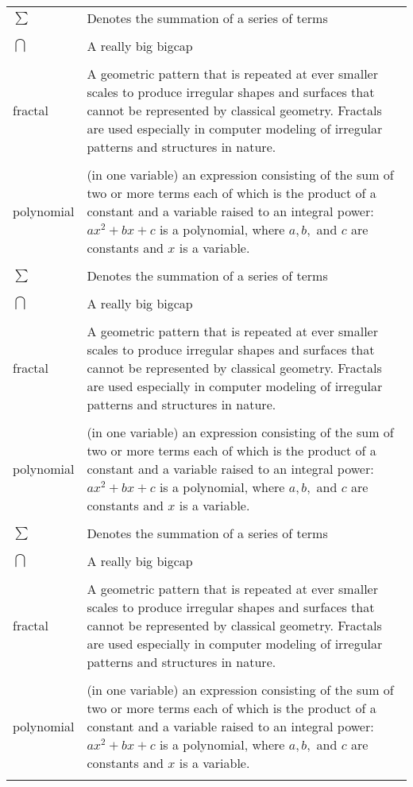 \begin{tabular}{lp{5in}}
$\sum$ & Denotes the summation of a series of terms\\
\\
$\bigcap$ & A really big bigcap\\
\\
fractal & A geometric pattern that is repeated at ever smaller
scales to produce irregular shapes and surfaces that cannot be represented by classical
geometry. Fractals are used especially in computer modeling of irregular patterns and structures in nature.}\\
\\
polynomial & (in one variable) an expression consisting of the sum of two
or more terms each of which is the product of a constant and a
variable raised to an integral power: $ax^2 + bx + c$ is a
polynomial, where $a, b,$ and $c$ are constants and $x$ is a
variable.}\\
\\
$\sum$ & Denotes the summation of a series of terms\\
\\
$\bigcap$ & A really big bigcap\\
\\
fractal & A geometric pattern that is repeated at ever smaller
scales to produce irregular shapes and surfaces that cannot be represented by classical
geometry. Fractals are used especially in computer modeling of irregular patterns and structures in nature.}\\
\\
polynomial & (in one variable) an expression consisting of the sum of two
or more terms each of which is the product of a constant and a
variable raised to an integral power: $ax^2 + bx + c$ is a
polynomial, where $a, b,$ and $c$ are constants and $x$ is a
variable.}\\
\\
$\sum$ & Denotes the summation of a series of terms\\
\\
$\bigcap$ & A really big bigcap\\
\\
fractal & A geometric pattern that is repeated at ever smaller
scales to produce irregular shapes and surfaces that cannot be represented by classical
geometry. Fractals are used especially in computer modeling of irregular patterns and structures in nature.}\\
\\
polynomial & (in one variable) an expression consisting of the sum of two
or more terms each of which is the product of a constant and a
variable raised to an integral power: $ax^2 + bx + c$ is a
polynomial, where $a, b,$ and $c$ are constants and $x$ is a
variable.}\\
\\
\end{tabular}
\doublespacing

